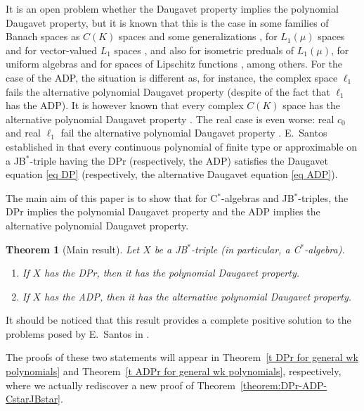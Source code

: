 \documentclass[10pt]{amsart}
\newtheorem{theorem}{Theorem}[section]
\begin{document}
	It is an open problem whether the Daugavet property implies the polynomial Daugavet property, but it is known that this is the case in some families of Banach spaces as $C(K)$ spaces and some generalizations \cite{ChoGarMaestreMartin2007,cgmm2}, for $L_1(\mu)$ spaces and for vector-valued $L_1$ spaces \cite{mmp}, and also for isometric preduals of $L_1(\mu)$, for uniform algebras and for spaces of Lipschitz functions \cite{MarRueda2022}, among others. For the case of the ADP, the situation is different as, for instance, the complex space $\ell_1$ fails the alternative polynomial Daugavet property \cite{ChoGarMaestreMartin2007} (despite of the fact that $\ell_1$ has the ADP). It is however known that every complex $C(K)$ space has the alternative polynomial Daugavet property \cite{ChoGarMaestreMartin2007}. The real case is even worse: real $c_0$ and real $\ell_1$ fail the alternative polynomial Daugavet property \cite{ChoGarMaestreMartin2007}. E.~Santos established in \cite{Santos2014} that every continuous polynomial of finite type or approximable on a JB$^*$-triple having the DPr (respectively, the ADP) satisfies the Daugavet equation \eqref{eq DP} (respectively, the alternative Daugavet equation \eqref{eq ADP}).
		
	The main aim of this paper is to show that for C$^*$-algebras and JB$^*$-triples, the DPr implies the polynomial Daugavet property and the ADP implies the alternative polynomial Daugavet property.
	
\begin{theorem}[Main result] Let $X$ be a JB$^*$-triple {\rm(}in particular, a C$^*$-algebra{\rm)}.
\begin{enumerate}[$(a)$]
\item If $X$ has the DPr, then it has the polynomial Daugavet property.
\item If $X$ has the ADP, then it has the alternative polynomial Daugavet property.
\end{enumerate}
\end{theorem}
	
It should be noticed that this result provides a complete positive solution to the problems posed by E.~Santos in \cite[\S 4]{Santos2014}.
	
The proofs of these two statements will appear in Theorem~\ref{t DPr for general wk polynomials} and Theorem~\ref{t ADPr for general wk polynomials}, respectively, where we actually rediscover a new proof of  Theorem~\ref{theorem:DPr-ADP-CstarJBstar}.
	
\end{document}

